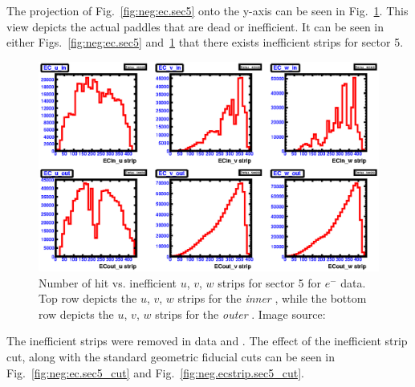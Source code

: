 %
The projection of Fig.~\ref{fig:neg:ec.sec5} onto the y-axis can be seen in Fig.~\ref{fig:neg.ecstrip.sec5}. This view depicts the actual paddles that are dead or inefficient. It can be seen in either Figs.~\ref{fig:neg:ec.sec5} and~\ref{fig:neg.ecstrip.sec5} that there exists inefficient  strips for sector 5.
\begin{figure}[h!]\begin{center}
\includegraphics[width=\figwidth,height=\hfigheight]{figures/calib/ec/pim_ecuvw_NOKnockout_sec5.eps}
\caption[Number of hit vs. inefficient  $u$, $v$, $w$ strips for sector 5 for $e^-$ data]{\label{fig:neg.ecstrip.sec5} Number of hit vs. inefficient  $u$, $v$, $w$ strips for sector 5 for $e^-$ data. Top row depicts the $u$, $v$, $w$  strips for the \emph{inner} , while the bottom row depicts the $u$, $v$, $w$  strips for the \emph{outer} . Image source:~\cite{clas.thesis.kunkel}}
\end{center}\end{figure}
The inefficient strips were removed in data and . The effect of the inefficient strip cut, along with the standard   geometric fiducial cuts can be seen in Fig.~\ref{fig:neg:ec.sec5_cut} and Fig.~\ref{fig:neg.ecstrip.sec5_cut}.
%
